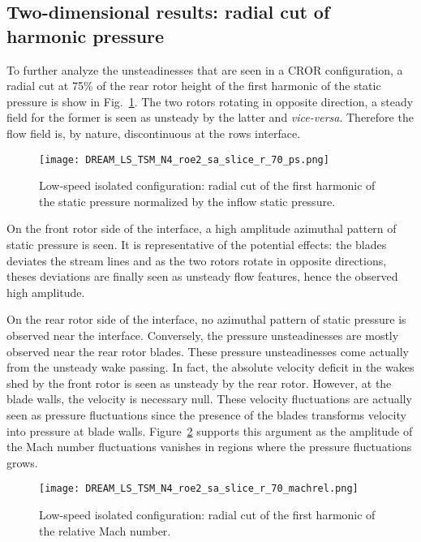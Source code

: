 \subsection{Two-dimensional results: radial cut of harmonic pressure}
\label{sub:dream_ls_hb_radial_cuts}

To further analyze the unsteadinesses that are seen
in a CROR configuration, a radial cut at 75\% of the
rear rotor height of the first harmonic
of the static pressure is show in 
Fig.~\ref{fig:dream_ls_hb_radial_cuts}.
The two rotors rotating in opposite direction, a steady
field for the former is seen as unsteady by the latter and \emph{vice-versa}.
Therefore the flow field is, by nature, discontinuous at the rows interface.
\begin{figure}[htp]
  \centering
  \texttt{[image: DREAM\_LS\_TSM\_N4\_roe2\_sa\_slice\_r\_70\_ps.png]}
  \caption{Low-speed isolated configuration: radial cut of the first harmonic of the
  static pressure normalized by the inflow static pressure.}
  \label{fig:dream_ls_hb_radial_cuts}
\end{figure}

On the front rotor side of the interface, a high amplitude azimuthal 
pattern of static pressure is seen. It is representative
of the potential effects: the blades deviates the stream lines and
as the two rotors rotate in opposite directions, theses deviations
are finally seen as unsteady flow features, hence the observed high amplitude.

On the rear rotor side of the interface, no azimuthal pattern 
of static pressure is observed near the interface.
Conversely, the pressure unsteadinesses are mostly observed near the rear rotor blades.
These pressure unsteadinesses come actually from the unsteady wake passing.
In fact, the absolute velocity deficit in the wakes shed by the front rotor
is seen as unsteady by the rear rotor. However, at the blade walls,
the velocity is necessary null. These 
velocity fluctuations are actually seen as pressure fluctuations since the presence
of the blades transforms velocity into pressure at blade walls.
Figure~\ref{fig:dream_ls_hb_radial_cuts_machrel}
supports this argument as the amplitude of the Mach number fluctuations
vanishes in regions where the pressure fluctuations grows.
\begin{figure}[htp]
  \centering
  \texttt{[image: DREAM\_LS\_TSM\_N4\_roe2\_sa\_slice\_r\_70\_machrel.png]}
  \caption{Low-speed isolated configuration: radial cut of the first harmonic of the
  relative Mach number.}
  \label{fig:dream_ls_hb_radial_cuts_machrel}
\end{figure}


